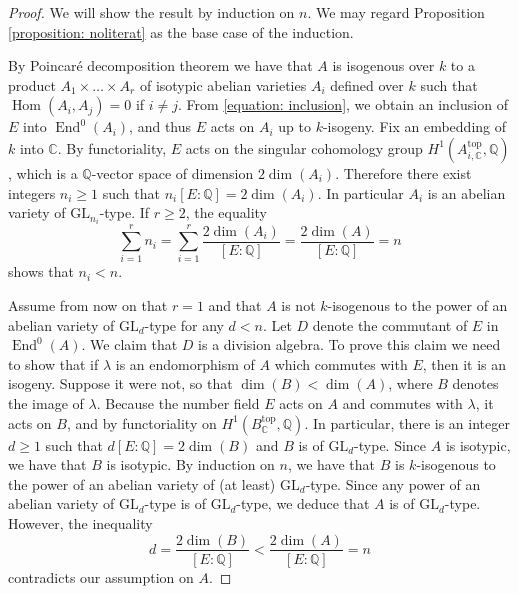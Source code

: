 \documentclass[oneside]{amsart}
\theoremstyle{remark}
\newcommand{\Q}{\mathbb Q}
\newcommand{\C}{\mathbb C}
\newcommand{\GL}{\mathrm{GL}}
\newcommand{\End}{\operatorname{End}}
\newcommand{\Hom}{\operatorname{Hom}}
\numberwithin{equation}{section}
\begin{document}
\begin{proof}
We will show the result by induction on $n$. We may regard Proposition \ref{proposition: noliterat} as the base case of the induction. 

By Poincaré decomposition theorem we have that $A$ is isogenous over $k$ to a product $A_1\times \dots \times A_r$ of isotypic abelian varieties $A_i$ defined over $k$ such that $\Hom(A_i,A_j)=0$ if $i\not = j$. From \eqref{equation: inclusion}, we obtain an inclusion of $E$ into $\End^0(A_i)$, and thus $E$ acts on $A_i$ up to $k$-isogeny. Fix an embedding of $k$ into $\C$. By functoriality, $E$ acts on the singular cohomology group $H^1(A_{i,\C}^{\mathrm{top}},\Q)$, which is a $\Q$-vector space of dimension $2\dim(A_i)$. Therefore there exist integers $n_i\geq 1$ such that $n_i[E:\Q]=2\dim(A_i)$. In particular $A_i$ is an abelian variety of $\GL_{n_i}$-type.
If $r\geq 2$, the equality
$$
\sum_{i=1}^{r} n_i= \sum_{i=1}^r \frac{2\dim(A_i)}{[E:\Q]}=\frac{2\dim(A)}{[E:\Q]}=n
$$ 
shows that $n_i<n$.

Assume from now on that $r=1$ and that $A$ is not $k$-isogenous to the power of an abelian variety of $\GL_d$-type for any $d<n$.
Let $D$ denote the commutant of $E$ in $\End^0(A)$. We claim that $D$ is a division algebra. To prove this claim we need to show that if $\lambda$ is an endomorphism of $A$ which commutes with $E$, then it is an isogeny. Suppose it were not, so that $\dim(B)<\dim(A)$, where $B$ denotes the image of $\lambda$. Because the number field $E$ acts on $A$ and commutes with $\lambda$, it acts on $B$, and by functoriality on $H^1(B_{\C}^{\mathrm{top}},\Q)$. In particular, there is an integer $d\geq 1$ such that $d[E:\Q]=2\dim(B)$ and $B$ is of $\GL_d$-type. Since $A$ is isotypic, we have that $B$ is isotypic. By induction on $n$, we have that $B$ is $k$-isogenous to the power of an abelian variety of (at least) $\GL_d$-type. Since any power of an abelian variety of $\GL_d$-type is of $\GL_d$-type, we deduce that $A$ is of $\GL_d$-type. However, the inequality 
$$
d=\frac{2\dim (B)}{[E:\Q]}<\frac{2\dim (A)}{[E:\Q]}=n
$$
contradicts our assumption on $A$.  


\end{proof}
\end{document}
